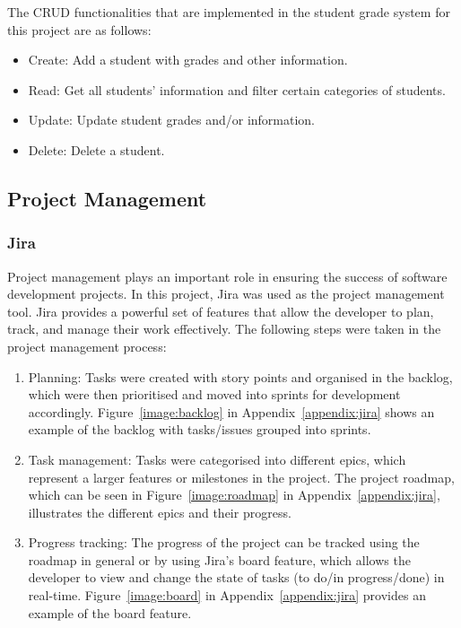 The CRUD functionalities that are implemented in the student grade system for this project are as follows:

\begin{itemize}
\item Create: Add a student with grades and other information.
\item Read: Get all students' information and filter certain categories of students.
\item Update: Update student grades and/or information.
\item Delete: Delete a student.
\end{itemize}

\subsection{Project Management}
\subsubsection{Jira}

Project management plays an important role in ensuring the success of software development projects. In this project, Jira was used as the project management tool. Jira provides a powerful set of features that allow the developer to plan, track, and manage their work effectively. The following steps were taken in the project management process:

\begin{enumerate}
  \item Planning: Tasks were created with story points and organised in the backlog, which were then prioritised and moved into sprints for development accordingly. Figure~\ref{image:backlog} in Appendix~\ref{appendix:jira} shows an example of the backlog with tasks/issues grouped into sprints.
  \item Task management: Tasks were  categorised into different epics, which represent a larger features or milestones in the project. The project roadmap, which can be seen in Figure~\ref{image:roadmap} in Appendix~\ref{appendix:jira}, illustrates the different epics and their progress.
  \item Progress tracking: The progress of the project can be tracked using the roadmap in general or by using Jira's board feature, which allows the developer to view and change the state of tasks (to do/in progress/done) in real-time. Figure~\ref{image:board} in Appendix~\ref{appendix:jira} provides an example of the board feature. 
\end{enumerate}
